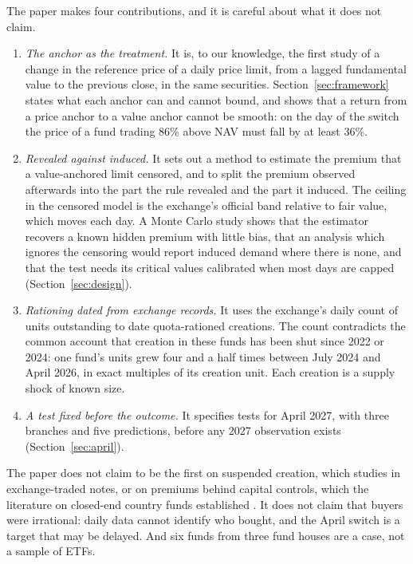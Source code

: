 \documentclass[10pt,journal,a4paper]{IEEEtran}
\theoremstyle{definition}
\begin{document}
The paper makes four contributions, and it is careful about what it does not claim.
\begin{enumerate}
\item \emph{The anchor as the treatment.} It is, to our knowledge, the first study of a change in the reference price of a daily price limit, from a lagged fundamental value to the previous close, in the same securities. Section~\ref{sec:framework} states what each anchor can and cannot bound, and shows that a return from a price anchor to a value anchor cannot be smooth: on the day of the switch the price of a fund trading 86\% above NAV must fall by at least 36\%.
\item \emph{Revealed against induced.} It sets out a method to estimate the premium that a value-anchored limit censored, and to split the premium observed afterwards into the part the rule revealed and the part it induced. The ceiling in the censored model is the exchange's official band relative to fair value, which moves each day. A Monte Carlo study shows that the estimator recovers a known hidden premium with little bias, that an analysis which ignores the censoring would report induced demand where there is none, and that the test needs its critical values calibrated when most days are capped (Section~\ref{sec:design}).
\item \emph{Rationing dated from exchange records.} It uses the exchange's daily count of units outstanding to date quota-rationed creations. The count contradicts the common account that creation in these funds has been shut since 2022 or 2024: one fund's units grew four and a half times between July 2024 and April 2026, in exact multiples of its creation unit. Each creation is a supply shock of known size.
\item \emph{A test fixed before the outcome.} It specifies tests for April 2027, with three branches and five predictions, before any 2027 observation exists (Section~\ref{sec:april}).
\end{enumerate}
The paper does not claim to be the first on suspended creation, which \citet{johnson2016essays} studies in exchange-traded notes, or on premiums behind capital controls, which the literature on closed-end country funds established \citep{bonserneal1990international}. It does not claim that buyers were irrational: daily data cannot identify who bought, and the April switch is a target that may be delayed. And six funds from three fund houses are a case, not a sample of ETFs.
\end{document}
